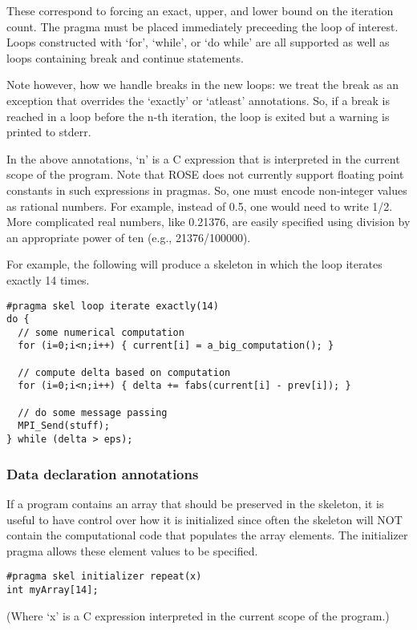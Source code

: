 \documentclass{article}
\begin{document}
These correspond to forcing an exact, upper, and lower bound on the
iteration count.  The pragma must be placed immediately preceeding the
loop of interest.  Loops constructed with `for', `while', or `do while'
are all supported as well as loops containing break and continue statements.

Note however, how we handle breaks in the new loops: we treat the break as an
exception that overrides the `exactly' or `atleast' annotations.  So, if a break
is reached in a loop before the n-th iteration, the loop is exited but a warning
is printed to stderr.

In the above annotations, `n' is a C expression that is interpreted in the
current scope of the program.
Note that ROSE does not currently support floating point constants in
such expressions in pragmas.
So, one must encode non-integer values as rational numbers.
For example, instead of 0.5, one would need to write 1/2.  More
complicated real numbers, like 0.21376, are easily specified using
division by an appropriate power of ten (e.g., 21376/100000).

For example, the following will produce a skeleton
in which the loop iterates exactly 14 times.

\begin{verbatim}
#pragma skel loop iterate exactly(14)
do {
  // some numerical computation
  for (i=0;i<n;i++) { current[i] = a_big_computation(); }

  // compute delta based on computation
  for (i=0;i<n;i++) { delta += fabs(current[i] - prev[i]); }

  // do some message passing
  MPI_Send(stuff);
} while (delta > eps);
\end{verbatim}

\subsubsection{Data declaration annotations}

If a program contains an array that should be preserved in the
skeleton, it is useful to have control over how it is initialized
since often the skeleton will NOT contain the computational code that
populates the array elements.  The initializer pragma allows these
element values to be specified.

\begin{verbatim}
#pragma skel initializer repeat(x)
int myArray[14];
\end{verbatim}

(Where `x' is a C expression interpreted in the current scope of the program.)
\end{document}
